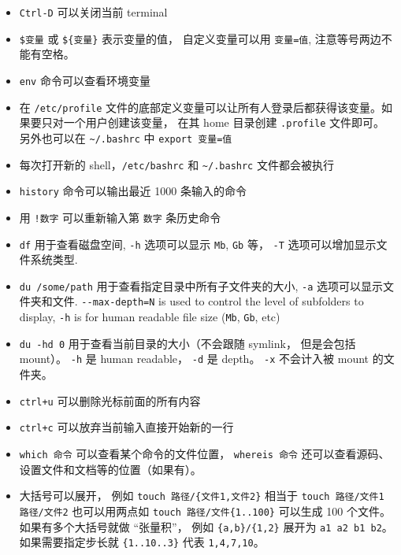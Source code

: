 \begin{itemize}
\item \verb`Ctrl-D` 可以关闭当前 terminal
\item \verb`$变量` 或 \verb|${变量}| 表示变量的值， 自定义变量可以用 \verb`变量=值`, 注意等号两边不能有空格。
\item \verb`env` 命令可以查看环境变量
\item 在 \verb`/etc/profile` 文件的底部定义变量可以让所有人登录后都获得该变量。如果要只对一个用户创建该变量， 在其 home 目录创建 \verb|.profile| 文件即可。 另外也可以在 \verb|~/.bashrc| 中 \verb|export 变量=值|
\item 每次打开新的 shell，\verb`/etc/bashrc` 和 \verb`~/.bashrc` 文件都会被执行
\item \verb|history| 命令可以输出最近 1000 条输入的命令
\item 用 \verb`!数字` 可以重新输入第 \verb`数字` 条历史命令
\item \verb`df` 用于查看磁盘空间, \verb`-h` 选项可以显示 \verb`Mb`, \verb`Gb` 等， \verb|-T| 选项可以增加显示文件系统类型.
\item \verb`du /some/path` 用于查看指定目录中所有子文件夹的大小, \verb`-a` 选项可以显示文件夹和文件. \verb`--max-depth=N` is used to control the level of subfolders to display, \verb`-h` is for human readable file size (\verb`Mb`, \verb`Gb`, etc)
\item \verb|du -hd 0| 用于查看当前目录的大小（不会跟随 symlink， 但是会包括 mount）。 \verb|-h| 是 human readable， \verb|-d| 是 depth。 \verb|-x| 不会计入被 mount 的文件夹。
\item \verb`ctrl+u` 可以删除光标前面的所有内容
\item \verb`ctrl+c` 可以放弃当前输入直接开始新的一行
\item \verb|which 命令| 可以查看某个命令的文件位置， \verb|whereis 命令| 还可以查看源码、设置文件和文档等的位置（如果有）。
\item 大括号可以展开， 例如 \verb|touch 路径/{文件1,文件2}| 相当于 \verb|touch 路径/文件1 路径/文件2| 也可以用两点如 \verb|touch 路径/文件{1..100}| 可以生成 100 个文件。 如果有多个大括号就做 “张量积”， 例如 \verb|{a,b}/{1,2}| 展开为 \verb|a1 a2 b1 b2|。 如果需要指定步长就 \verb|{1..10..3}| 代表 \verb|1,4,7,10|。
\end{itemize}


